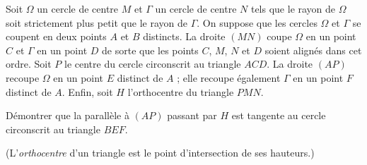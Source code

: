 Soit $\Omega$ un cercle de centre $M$ et $\Gamma$ un cercle de centre
$N$ tels que le rayon de $\Omega$ soit strictement plus petit que le
rayon de $\Gamma$. On suppose que les cercles $\Omega$ et $\Gamma$ se
coupent en deux points $A$ et $B$ distincts. La droite $(MN)$ coupe
$\Omega$ en un point $C$ et $\Gamma$ en un point $D$ de sorte que les
points $C$, $M$, $N$ et $D$ soient alignés dans cet ordre. Soit $P$ le
centre du cercle circonscrit au triangle $ACD$. La droite $(AP)$
recoupe $\Omega$ en un point $E$ distinct de $A$ ; elle recoupe
également $\Gamma$ en un point $F$ distinct de $A$. Enfin, soit $H$
l'orthocentre du triangle $PMN$.

Démontrer que la parallèle à $(AP)$ passant par $H$ est tangente au
cercle circonscrit au triangle $BEF$.

(L'\emph{orthocentre} d'un triangle est le point d'intersection de ses
hauteurs.)

